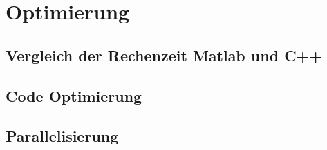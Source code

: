 \chapter{Optimierung}
\section{Vergleich der Rechenzeit Matlab und C++}
\section{Code Optimierung}
\section{Parallelisierung}